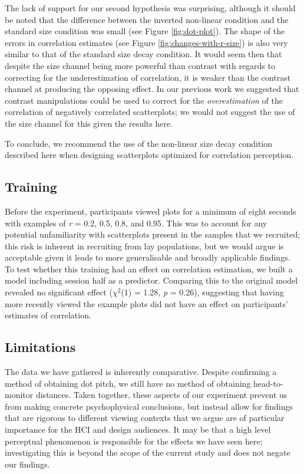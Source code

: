 \documentclass{vgtc}                          %
\begin{document}
The lack of support for our second hypothesis was surprising, although it should be noted that the difference between the inverted non-linear condition and the standard size
condition was small (see Figure \ref{fig:dot-plot}). The shape of the errors
in correlation estimates (see Figure \ref{fig:changes-with-r-size}) is also
very similar to that of the standard size decay condition. It would seem then that
despite the size channel being more powerful than contrast with regards to correcting
for the underestimation of correlation, it is weaker than the contrast channel at
producing the opposing effect. In our previous work we suggested that contrast
manipulations could be used to correct for the \emph{overestimation} of the correlation
of negatively correlated scatterplots; we would not suggest the use of the size
channel for this given the results here.

To conclude, we recommend the use of the non-linear size decay condition described
here when designing scatterplots optimized for correlation perception.

\hypertarget{training}{%
\subsection{Training}\label{training}}

Before the experiment, participants viewed plots for a minimum of
eight seconds with examples of \emph{r} = 0.2, 0.5, 0.8, and 0.95. This was to account
for any potential unfamiliarity with scatterplots present in the samples
that we recruited; this risk is inherent in recruiting from lay populations, but we
would argue is acceptable given it leads to more generalisable and broadly
applicable findings. To test whether this training had an effect on correlation estimation,
we built a model including session half as a predictor. Comparing this
to the original model revealed no significant effect (\(\chi^2\)(1)
= 1.28, \emph{p} = 0.26),
suggesting that having more recently viewed the example plots did not have an effect
on participants' estimates of correlation.

\hypertarget{limitations}{%
\subsection{Limitations}\label{limitations}}

The data we have gathered is inherently comparative.
Despite confirming a method of obtaining dot pitch, we still have no method of obtaining head-to-monitor distances. Taken together, these aspects of our experiment prevent us from making concrete psychophysical conclusions, but instead allow for findings that are rigorous to different viewing contexts
that we argue are of particular importance for the HCI and design audiences. It
may be that a high level perceptual phenomenon is responsible for the effects
we have seen here; investigating this is beyond the scope of the current study and
does not negate our findings.
\end{document}
